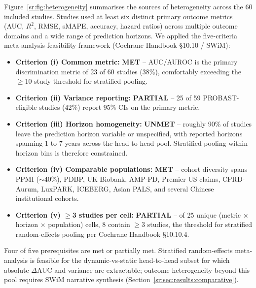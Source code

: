 Figure~\ref{sr:fig:heterogeneity} summarises the sources of heterogeneity across the 60 included studies. Studies used at least six distinct primary outcome metrics (AUC, $R^2$, RMSE, sMAPE, accuracy, hazard ratios) across multiple outcome domains and a wide range of prediction horizons. We applied the five-criteria meta-analysis-feasibility framework (Cochrane Handbook \S10.10 / SWiM):
\begin{itemize}
    \item \textbf{Criterion (i) Common metric:} \textbf{MET} -- AUC/AUROC is the primary discrimination metric of 23 of 60 studies (38\%), comfortably exceeding the $\geq$10-study threshold for stratified pooling.
    \item \textbf{Criterion (ii) Variance reporting:} \textbf{PARTIAL} -- 25 of 59 PROBAST-eligible studies (42\%) report 95\% CIs on the primary metric.
    \item \textbf{Criterion (iii) Horizon homogeneity:} \textbf{UNMET} -- roughly 90\% of studies leave the prediction horizon variable or unspecified, with reported horizons spanning 1 to 7 years across the head-to-head pool. Stratified pooling within horizon bins is therefore constrained.
    \item \textbf{Criterion (iv) Comparable populations:} \textbf{MET} -- cohort diversity spans PPMI ($\sim$40\%), PDBP, UK Biobank, AMP-PD, Premier US claims, CPRD-Aurum, LuxPARK, ICEBERG, Asian PALS, and several Chinese institutional cohorts.
    \item \textbf{Criterion (v) $\geq$3 studies per cell:} \textbf{PARTIAL} -- of 25 unique (metric $\times$ horizon $\times$ population) cells, 8 contain $\geq$3 studies, the threshold for stratified random-effects pooling per Cochrane Handbook \S10.10.4.
\end{itemize}
\noindent Four of five prerequisites are met or partially met. Stratified random-effects meta-analysis is feasible for the dynamic-vs-static head-to-head subset for which absolute $\Delta$AUC and variance are extractable; outcome heterogeneity beyond this pool requires SWiM narrative synthesis (Section~\ref{sr:sec:results:comparative}).

